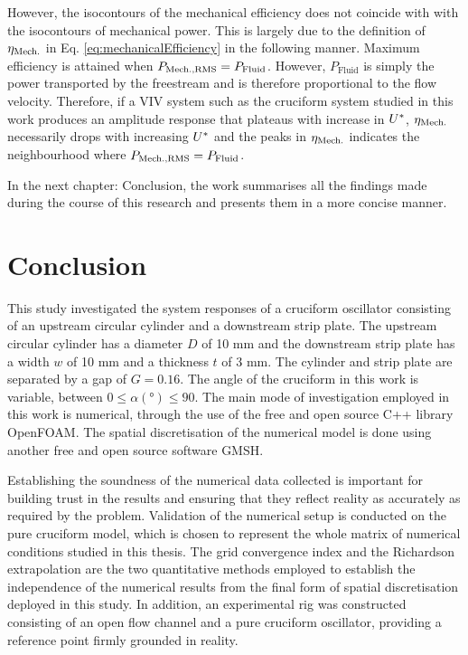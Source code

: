 \documentclass[oneside]{utmthesis}
\begin{document}
However, the isocontours of the mechanical efficiency does not coincide with with the isocontours of mechanical power. This is largely due to the definition of $\eta_{\text{Mech.}}$ in Eq. \ref{eq:mechanicalEfficiency} in the following manner. Maximum efficiency is attained when $P_{\text{Mech.,RMS}} = P_{\text{Fluid}}$. However, $P_{\text{Fluid}}$ is simply the power transported by the freestream and is therefore proportional to the flow velocity. Therefore, if a VIV system such as the cruciform system studied in this work produces an amplitude response that plateaus with increase in $U^{*}$, $\eta_{\text{Mech.}}$ necessarily drops with increasing $U^{*}$ and the peaks in $\eta_{\text{Mech.}}$ indicates the neighbourhood where $P_{\text{Mech.,RMS}} = P_{\text{Fluid}}$.

In the next chapter: Conclusion, the work summarises all the findings made during the course of this research and presents them in a more concise manner.

\chapter{Conclusion} \label{chap:conclusion}
This study investigated the system responses of a cruciform oscillator consisting of an upstream circular cylinder and a downstream strip plate. The upstream circular cylinder has a diameter $D$ of 10 mm and the downstream strip plate has a width $w$ of 10 mm and a thickness $t$ of 3 mm.  The cylinder and strip plate are separated by a gap of $G = 0.16$. The angle of the cruciform in this work is variable, between $0 \leq \alpha (\si{\degree}) \leq 90$. The main mode of investigation employed in this work is numerical, through the use of the free and open source C++ library OpenFOAM. The spatial discretisation of the numerical model is done using another free and open source software GMSH.

Establishing the soundness of the numerical data collected is important for building trust in the results and ensuring that they reflect reality as accurately as required by the problem. Validation of the numerical setup is conducted on the pure cruciform model, which is chosen to represent the whole matrix of numerical conditions studied in this thesis. The grid convergence index and the Richardson extrapolation are the two quantitative methods employed to establish the independence of the numerical results from the final form of spatial discretisation deployed in this study. In addition, an experimental rig was constructed consisting of an open flow channel and a pure cruciform oscillator, providing a reference point firmly grounded in reality.
\end{document}
